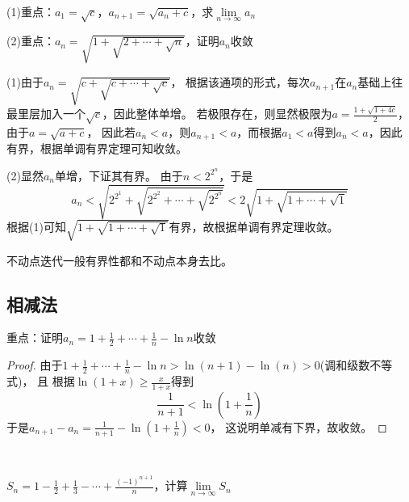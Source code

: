 ~

\begin{exercise}[两道经典循环根式]
  (1)重点：$a_1 = \sqrt{c}$，$a_{n+1} = \sqrt{a_n + c}$，求$\lim \limits _{n \rightarrow \infty} a_n$

  (2)重点：$a_n = \sqrt{1 + \sqrt{2 + \cdots + \sqrt{n}}}$，证明$a_n$收敛
\end{exercise}

\begin{solution}
  (1)由于$a_n = \sqrt{c + \sqrt{c + \cdots + \sqrt{c}}}$，
  根据该通项的形式，每次$a_{n+1}$在$a_n$基础上往最里层加入一个$\sqrt{c}$，因此整体单增。
  若极限存在，则显然极限为$a = \frac{1 + \sqrt{1 + 4c}}{2}$，
  由于$a = \sqrt{a + c}$，
  因此若$a_n < a$，则$a_{n+1} < a$，而根据$a_1 < a$得到$a_n < a$，因此有界，根据单调有界定理可知收敛。

  (2)显然$a_n$单增，下证其有界。
  由于$n < 2^{2^n}$，于是
  \begin{equation*}
    a_n < \sqrt{2^{2^1} + \sqrt{2^{2^2} + \cdots + \sqrt{2^{2^n}}}} < 2 \sqrt{1 + \sqrt{1 + \cdots + \sqrt{1}}}
  \end{equation*}
  根据(1)可知$\sqrt{1 + \sqrt{1 + \cdots + \sqrt{1}}}$有界，故根据单调有界定理收敛。
\end{solution}

\begin{note}
  不动点迭代一般有界性都和不动点本身去比。
\end{note}

\subsection{相减法}

\begin{exercise}[Euler常数]
  重点：证明$a_n = 1 + \frac{1}{2} + \cdots + \frac{1}{n} - \ln n$收敛
\end{exercise}

\begin{proof}
  由于$1 + \frac{1}{2} + \cdots + \frac{1}{n} - \ln n > \ln(n+1) - \ln(n) > 0$(调和级数不等式)，
  且
  根据$\ln(1 + x) \geq \frac{x}{1+x}$得到
  \begin{equation*}
    \frac{1}{n+1} < \ln (1 + \frac{1}{n})
  \end{equation*}
  于是$a_{n+1} - a_n = \frac{1}{n+1} - \ln(1 + \frac{1}{n} ) < 0$，
  这说明单减有下界，故收敛。
\end{proof}

~

\begin{exercise}[交替级数]
  $S_n = 1 - \frac{1}{2} + \frac{1}{3} - \cdots + \frac{(-1)^{n+1}}{n}$，计算$\lim \limits _{n \rightarrow \infty} S_n$
\end{exercise}


